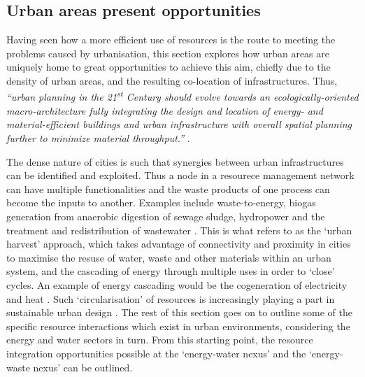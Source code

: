 \subsection{Urban areas present opportunities}
\label{sec:urbanOpps}
Having seen how a more efficient use of resources is the route to meeting the problems caused by urbanisation, this section explores how urban areas are uniquely home to great opportunities to achieve this aim, chiefly due to the density of urban areas, and the resulting co-location of infrastructures. Thus, \emph{``urban planning in the 21\textsuperscript{st} Century should evolve towards an ecologically-oriented macro-architecture fully integrating the design and location of energy- and material-efficient buildings and urban infrastructure with overall spatial planning further to minimize material throughput.''} \citep{Rees1999}. 

The dense nature of cities is such that synergies between urban infrastructures can be identified and exploited. Thus a node in a resourece management network can have multiple functionalities and the waste products of one process can become the inputs to another. Examples include waste-to-energy, biogas generation from anaerobic digestion of sewage sludge, hydropower and the treatment and redistribution of wastewater \citep{Kharrazi2012}. This is what \citet{Leduc2010} refers to as the `urban harvest' approach, which takes advantage of connectivity and proximity in cities to maximise the resuse of water, waste and other materials within an urban system, and the cascading of energy through multiple uses in order to `close' cycles. An example of energy cascading would be the cogeneration of electricity and heat \citep{Grubler2009}. Such `circularisation' of resources is increasingly playing a part in sustainable urban design \citep{Meijer2011}. The rest of this section goes on to outline some of the specific resource interactions which exist in urban environments, considering the energy and water sectors in turn. From this starting point, the resource integration opportunities possible at the `energy-water nexus' and the `energy-waste nexus' can be outlined.

